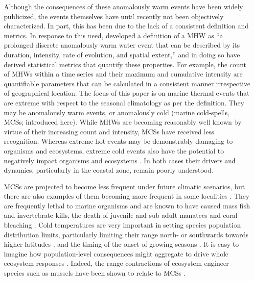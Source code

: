 \documentclass[a4paper,10pt,review]{elsarticle}
\begin{document}
Although the consequences of these anomalously warm events have been widely publicized, the events themselves have until recently not been objectively characterized. In part, this has been due to the lack of a consistent definition and metrics. In response to this need, \citet{Hobday2016} developed a definition of a MHW as ``a prolonged discrete anomalously warm water event that can be described by its duration, intensity, rate of evolution, and spatial extent,'' and in doing so have derived statistical metrics that quantify these properties. For example, the count of MHWs within a time series and their maximum and cumulative intensity are quantifiable parameters that can be calculated in a consistent manner irrespective of geographical location. The focus of this paper is on marine thermal events that are extreme with respect to the seasonal climatology as per the \citet{Hobday2016} definition. They may be anomalously warm events, or anomalously cold (marine cold-spells, MCSs; introduced here). While MHWs are becoming reasonably well known by virtue of their increasing count and intensity, MCSs have received less recognition. Whereas extreme hot events may be demonstrably damaging to organisms and ecosystems, extreme cold events also have the potential to negatively impact organisms and ecosystems \citep{Lirman2011}. In both cases their drivers and dynamics, particularly in the coastal zone, remain poorly understood.

MCSs are projected to become less frequent under future climatic scenarios, but there are also examples of them becoming more frequent in some localities \citep[e.g.][]{Gershunov2008, Matthes2015}. They are frequently lethal to marine organisms \citep{Woodward1987} and are known to have caused mass fish \citep{Gunter1941, Gunter1951, Holt1983} and invertebrate \citep{Gunter1951, Crisp1964} kills, the death of juvenile and sub-adult manatees \citep{OShea1985, Marsh1986} and coral bleaching \citep{Lirman2011}. Cold temperatures are very important in setting species population distribution limits, particularly limiting their range north- or southwards towards higher latitudes \citep{Firth2011}, and the timing of the onset of growing seasons \citep{Jentsch2007}. It is easy to imagine how population-level consequences might aggregate to drive whole ecosystem responses \citep[e.g.][]{Kreyling2008, Rehage2016}. Indeed, the range contractions of ecosystem engineer species such as mussels have been shown to relate to MCSs \citep{Firth2011, Firth2015}.
\end{document}
